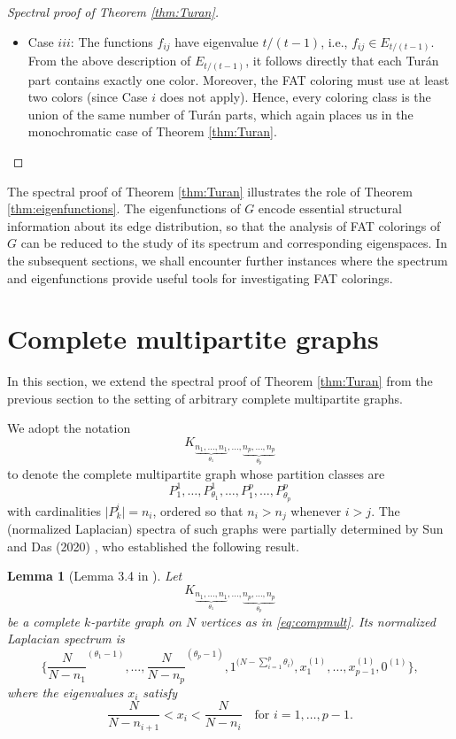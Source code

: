 \documentclass{article}
\theoremstyle{plain}
\newtheorem{lemma}[theorem]{Lemma}
\theoremstyle{definition}
\theoremstyle{remark}
\begin{document}
\begin{proof}[Spectral proof of Theorem \ref{thm:Turan}]
\begin{itemize}
    \item  Case $iii$:
     The functions $f_{ij}$ have eigenvalue $t/(t-1)$, i.e., $f_{ij}\in E_{t/(t-1)}$. From the above description of $E_{t/(t-1)}$, it follows directly that each Turán part contains exactly one color. 
Moreover, the FAT coloring must use at least two colors (since Case $i$ does not apply).
 Hence, every coloring class is the union of the same number of Turán parts, which again places us in the monochromatic case of Theorem \ref{thm:Turan}.
\end{itemize}
\end{proof}

The spectral proof of Theorem \ref{thm:Turan} illustrates the role of Theorem \ref{thm:eigenfunctions}. The eigenfunctions of $G$ encode essential structural information about its edge distribution, so that the analysis of FAT colorings of $G$ can be reduced to the study of its spectrum and corresponding eigenspaces. In the subsequent sections, we shall encounter further instances where the spectrum and eigenfunctions provide useful tools for investigating FAT colorings.

\section{Complete multipartite graphs}\label{sec:multipartite}
In this section, we extend the spectral proof of Theorem \ref{thm:Turan} from the previous section to the setting of arbitrary complete multipartite graphs.

We adopt the notation
\begin{equation}\label{eq:compmult}
    K_{\underbrace{n_1, \ldots, n_1}_{\theta_1}, \ldots, \underbrace{n_p, \ldots, n_p}_{\theta_p}}
\end{equation}
to denote the complete multipartite graph whose partition classes are
\begin{equation}\label{eq:partclasses}
    P^1_1,\ldots,P^1_{\theta_1},\ldots,P^p_{1},\ldots,P^p_{\theta_p}
\end{equation}
with cardinalities $\bigl|P^i_k\bigr| = n_i$,
ordered so that $n_i> n_j$ whenever $i> j$.
The (normalized Laplacian) spectra of such graphs were partially determined by Sun and Das (2020) \cite{SunDas2020.2}, who established the following result.

\begin{lemma}[Lemma 3.4 in \cite{SunDas2020.2}]\label{lem:3.4sundas}
    Let 
    \[
    K_{\underbrace{n_1, \ldots, n_1}_{\theta_1}, \ldots, \underbrace{n_p, \ldots, n_p}_{\theta_p}}
    \]
    be a complete $k$-partite graph on $N$ vertices as in \eqref{eq:compmult}. Its normalized Laplacian spectrum is
    \begin{equation}
        \biggl\{ \frac{N}{N-n_1}^{(\theta_1-1)},  \ldots, \frac{N}{N-n_p}^{(\theta_p-1)}, 1^{\bigl(N-\sum_{i=1}^p\theta_i\bigr)}, x_1^{(1)},\ldots,x_{p-1}^{(1)},0^{(1)}\biggr\},
    \end{equation}
    where the eigenvalues $x_i$ satisfy
    \[
    \frac{N}{N-n_{i+1}}<x_i<\frac{N}{N-n_i} \quad \text{for } i=1,\ldots,p-1.
    \]
\end{lemma}
\end{document}
